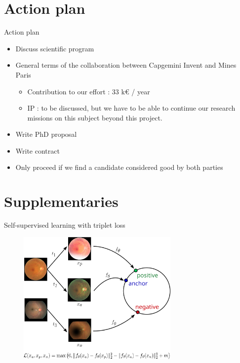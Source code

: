 \documentclass[xcolor=pdftex,dvipsnames,table,mathserif]{beamer}
\begin{document}
\section{Action plan}

\begin{frame}{Action plan}

  \begin{itemize}
  \item Discuss scientific program
  \item General terms of the collaboration between Capgemini Invent and Mines Paris
    \begin{itemize}
    \item Contribution to our effort : 33 k€ / year
    \item IP : to be discussed, but we have to be able to continue our research missions on this subject beyond this project.
    \end{itemize}
  \item Write PhD proposal
  \item Write contract
  \item Only proceed if we find a candidate considered good by both parties
  \end{itemize}

\end{frame}


\section{Supplementaries}

\begin{frame}{Self-supervised learning with triplet loss}

\begin{figure}[ht]
  \centering
  \includegraphics[width=0.7\textwidth]{ssl}
\end{figure}

\end{frame}
\end{document}
